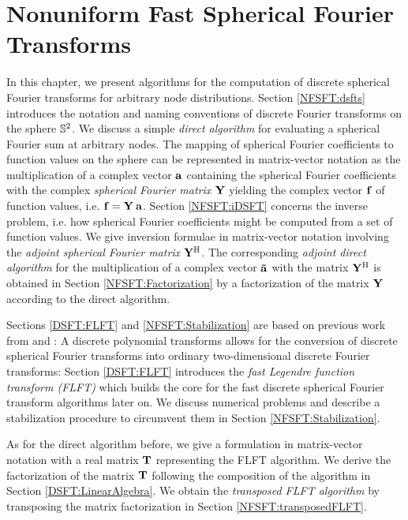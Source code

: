 \chapter{Nonuniform Fast Spherical Fourier Transforms}
\label{DSFT}

In this chapter, we present algorithms for the computation of discrete
spherical Fourier transforms for arbitrary node distributions. 
Section \ref{NFSFT:dsfts} introduces the notation and naming conventions
of discrete Fourier transforms on the sphere $\mathbb{S}^2$. We discuss
a simple \emph{direct algorithm} for evaluating a spherical Fourier sum
at arbitrary nodes. The mapping of spherical Fourier coefficients to function 
values on the sphere can be represented in matrix-vector notation as the
multiplication of a complex vector $\mathbf{a}$ containing the spherical Fourier 
coefficients with the complex \emph{spherical Fourier matrix} 
$\mathbf{Y}$ yielding the complex vector $\mathbf{f}$ of function values, i.e. 
$\mathbf{f} = \mathbf{Y} \: \mathbf{a}$. 
Section \ref{NFSFT:iDSFT} concerns the inverse problem, i.e. how spherical Fourier
coefficients might be computed from a set of function values. We give inversion
formulae in matrix-vector notation involving the \emph{adjoint spherical Fourier matrix} $\mathbf{Y}^{\text{\rm{H}}}$. 
The corresponding \emph{adjoint direct algorithm} for the multiplication of
a complex vector $\mathbf{\tilde{a}}$ with the matrix $\mathbf{Y}^{\text{\rm{H}}}$ is 
obtained in Section \ref{NFSFT:Factorization} by a factorization of the 
matrix $\mathbf{Y}$ according to the direct algorithm.

Sections \ref{DSFT:FLFT} and \ref{NFSFT:Stabilization} are based on previous work from 
\cite{postta97} and \cite{kupo02}:
A discrete polynomial transforms allows for the conversion of
discrete spherical Fourier transforms into ordinary two-dimensional
discrete Fourier transforms: Section \ref{DSFT:FLFT} introduces
the \emph{fast Legendre function transform (FLFT)} which builds the core
for the fast discrete spherical Fourier transform algorithms later 
on. We discuss numerical problems and describe a stabilization 
procedure to circumvent them in Section \ref{NFSFT:Stabilization}.

As for the direct algorithm before, we give a formulation in matrix-vector notation 
with a real matrix $\mathbf{T}$ representing the FLFT algorithm.
We derive the factorization of the matrix $\mathbf{T}$ following the composition of
the algorithm in Section \ref{DSFT:LinearAlgebra}. We obtain the \emph{transposed FLFT algorithm} by transposing the matrix factorization in Section \ref{NFSFT:transposedFLFT}.

